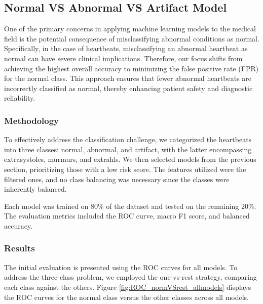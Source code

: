 \subsection{Normal VS Abnormal VS Artifact Model}
One of the primary concerns in applying machine learning models to the medical field is the potential 
consequence of misclassifying abnormal conditions as normal. Specifically, in the case of heartbeats, 
misclassifying an abnormal heartbeat as normal can have severe clinical implications. Therefore, 
our focus shifts from achieving the highest overall accuracy to minimizing the false positive rate (FPR) 
for the normal class. This approach ensures that fewer abnormal heartbeats are incorrectly classified as 
normal, thereby enhancing patient safety and diagnostic reliability.

\subsubsection{Methodology}
To effectively address the classification challenge, we categorized the heartbeats into three classes: 
normal, abnormal, and artifact, with the latter encompassing extrasystoles, murmurs, and extrahls. 
We then selected models from the previous section, prioritizing those with a low risk score. 
The features utilized were the filtered ones, and no class balancing was necessary since the classes 
were inherently balanced.

Each model was trained on 80\% of the dataset and tested on the remaining 20\%. 
The evaluation metrics included the ROC curve, macro F1 score, and balanced accuracy.


\subsubsection{Results}
The initial evaluation is presented using the ROC curves for all models. To address 
the three-class problem, we employed the one-vs-rest strategy, comparing each class against 
the others. Figure \ref{fig:ROC_normVSrest_allmodels} displays the ROC curves for the normal 
class versus the other classes across all models.

